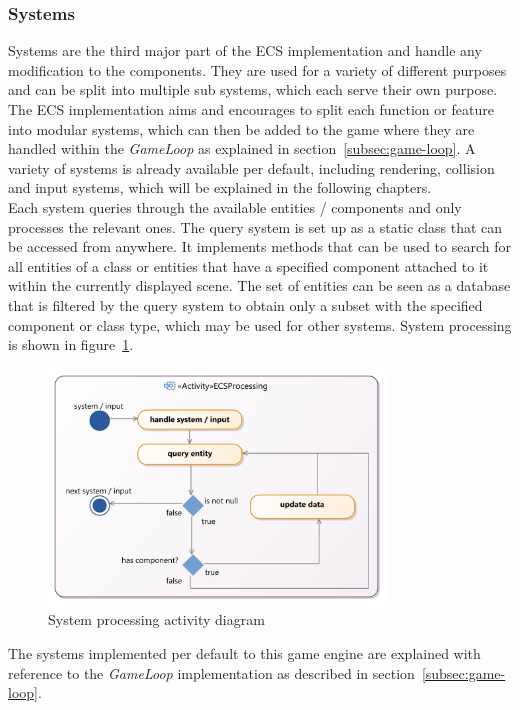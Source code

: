 \subsubsection{Systems}\label{subsubsec:systems}
Systems are the third major part of the ECS implementation and handle any modification to the components.
They are used for a variety of different purposes and can be split into multiple sub systems, which each serve their own purpose.
The ECS implementation aims and encourages to split each function or feature into modular systems, which can then be added to the game where they
are handled within the \textit{GameLoop} as explained in section~\ref{subsec:game-loop}.
A variety of systems is already available per default, including rendering, collision and input systems, which will be explained in the following chapters.
\\
Each system queries through the available entities / components and only processes the relevant ones.
The query system is set up as a static class that can be accessed from anywhere.
It implements methods that can be used to search for all entities of a class or entities that have a specified component
attached to it within the currently displayed scene.
The set of entities can be seen as a database that is filtered by the query system to obtain only a subset with the specified component or class type, which may be used
for other systems.
System processing is shown in figure~\ref{fig:ecs-system-processing}.
\begin{figure}
    \centering
    \includegraphics[width=0.8\textwidth]{Pictures/res/implementation/ecs-system-processing}
    \caption{System processing activity diagram}
    \label{fig:ecs-system-processing}
\end{figure}
The systems implemented per default to this game engine are explained with reference to the \textit{GameLoop} implementation
as described in section~\ref{subsec:game-loop}.
